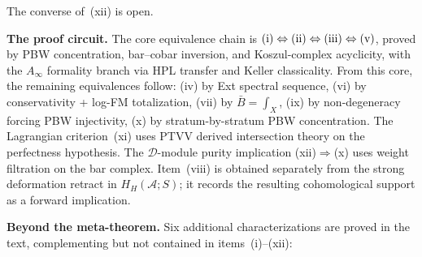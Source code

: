 \documentclass[11pt]{report}
\theoremstyle{definition}
\theoremstyle{remark}
\providecommand{\cA}{\mathcal{A}}
\providecommand{\barB}{\bar{B}}
\numberwithin{equation}{section}
\begin{document}
\noindent
The converse of~(xii) is open.

\medskip
\noindent\textbf{The proof circuit.}
The core equivalence chain is
$\textup{(i)} \Leftrightarrow \textup{(ii)}
\Leftrightarrow \textup{(iii)}
\Leftrightarrow \textup{(v)}$,
proved by PBW concentration, bar--cobar inversion, and
Koszul-complex acyclicity, with the $A_\infty$
formality branch via HPL transfer and Keller classicality. From this
core, the remaining equivalences follow:
(iv) by Ext spectral sequence,
(vi) by conservativity + log-FM totalization,
(vii) by $\barB = \int_X$,
(ix) by non-degeneracy forcing PBW injectivity,
(x) by stratum-by-stratum PBW concentration.
The Lagrangian criterion~(xi) uses PTVV derived intersection theory
on the perfectness hypothesis. The $\mathcal{D}$-module purity
implication (xii)$\Rightarrow$(x) uses weight filtration on the bar
complex.  Item~(viii) is obtained separately from the strong
deformation retract in \(H_H(\cA;S)\); it records the resulting
cohomological support as a forward implication.

\medskip
\noindent\textbf{Beyond the meta-theorem.}
Six additional characterizations are proved in the text, complementing
but not contained in items~(i)--(xii):
\end{document}
